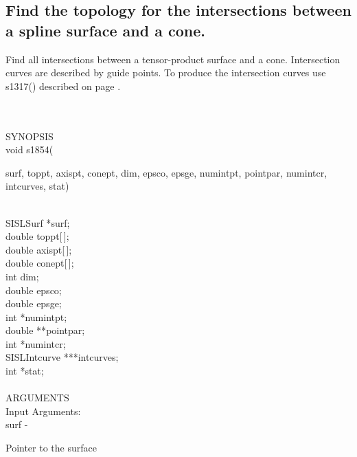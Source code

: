 \subsection{Find the topology for the intersections between a spline surface and a cone.}
\begin{minipg1}
  Find all intersections between a tensor-product surface and a cone.
  Intersection curves are described by guide points.
  To produce the intersection curves use s1317() described on page \pageref{s1317}.
\end{minipg1} \\ \\
SYNOPSIS\\
        \>void s1854(\begin{minipg3}
                        {\fov surf}, {\fov toppt}, {\fov axispt}, {\fov conept}, {\fov dim}, {\fov epsco}, {\fov epsge}, {\fov numintpt}, {\fov pointpar},
                        {\fov numintcr}, {\fov intcurves}, {\fov stat})
                \end{minipg3}\\[0.3ex]
                \>\>    SISLSurf        \>      *{\fov surf};\\
                \>\>    double  \>      {\fov toppt}[\,];\\
                \>\>    double  \>      {\fov axispt}[\,];\\
                \>\>    double  \>      {\fov conept}[\,];\\
                \>\>    int     \>      {\fov dim};\\
                \>\>    double  \>      {\fov epsco};\\
                \>\>    double  \>      {\fov epsge};\\
                \>\>    int     \>      *{\fov numintpt};\\
                \>\>    double  \>      **{\fov pointpar};\\
                \>\>    int     \>      *{\fov numintcr};\\
                \>\>    SISLIntcurve\>  ***{\fov intcurves};\\
                \>\>    int     \>      *{\fov stat};\\
\\
ARGUMENTS\\
        \>Input Arguments:\\
        \>\>    {\fov surf}\> - \>      \begin{minipg2}
                                Pointer to the surface
                                \end{minipg2}\\
